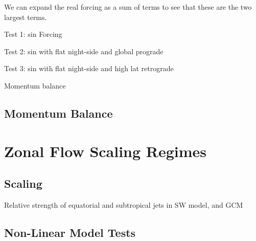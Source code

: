 We can expand the real forcing as a sum of terms to see that these are the two largest terms.

Test 1: sin Forcing

Test 2: sin with flat night-side and global prograde

Test 3: sin with flat night-side and high lat retrograde

Momentum balance


\subsection{Momentum Balance}




\section{Zonal Flow Scaling Regimes}

\subsection{Scaling}

Relative strength of equatorial and subtropical jets in SW model, and GCM

\subsection{Non-Linear Model Tests}


